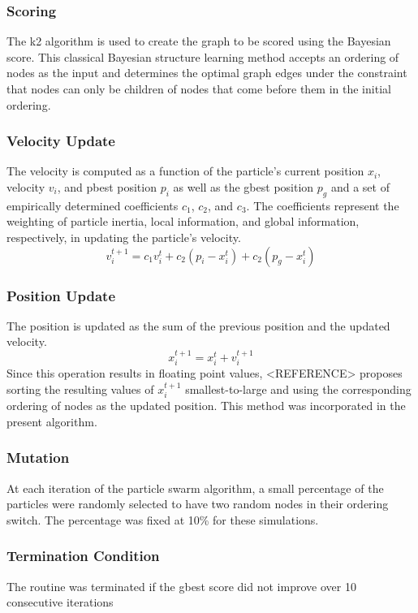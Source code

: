 \documentclass[twoside,11pt]{article}
\begin{document}
\subsubsection{Scoring}
The k2 algorithm is used to create the graph to be scored using the Bayesian score. This classical Bayesian structure learning method accepts an ordering of nodes as the input and determines the optimal graph edges under the constraint that nodes can only be children of nodes that come before them in the initial ordering.
\subsubsection{Velocity Update}
The velocity is computed as a function of the particle's current position $x_i$, velocity $v_i$, and pbest position $p_i$ as well as the gbest position $p_g$ and a set of empirically determined coefficients $c_1$, $c_2$, and $c_3$. The coefficients represent the weighting of particle inertia, local information, and global information, respectively, in updating the particle's velocity.
\begin{equation}
    v^{t+1}_i = c_1 v^t_i + c_2(p_i - x_i^t) + c_2(p_g - x_i^t)
\end{equation}
\subsubsection{Position Update}
The position is updated as the sum of the previous position and the updated velocity.
\begin{equation}
    x^{t+1}_i = x^t_i + v^{t+1}_i
\end{equation}
Since this operation results in floating point values, <REFERENCE> proposes sorting the resulting values of $x^{t+1}_i$ smallest-to-large and using the corresponding ordering of nodes as the updated position. This method was incorporated in the present algorithm.
\subsubsection{Mutation}
At each iteration of the particle swarm algorithm, a small percentage of the particles were randomly selected to have two random nodes in their ordering switch. The percentage was fixed at 10\% for these simulations.
\subsubsection{Termination Condition}
The routine was terminated if the gbest score did not improve over 10 consecutive iterations
\end{document}
